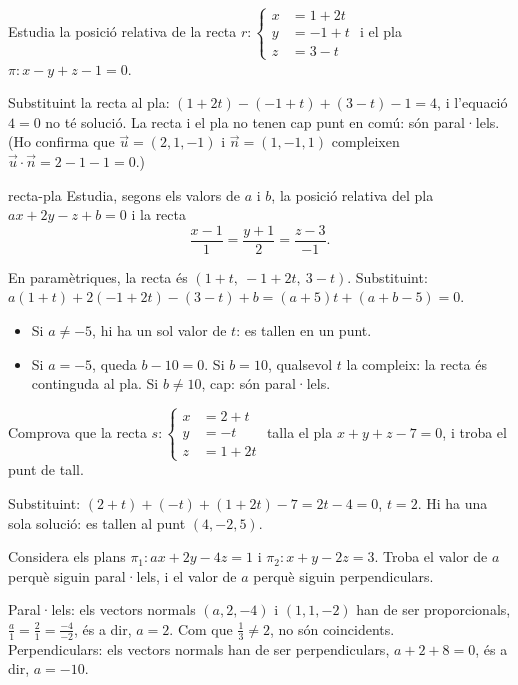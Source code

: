 \begin{apartats}

Estudia la posició relativa de la recta
$r\colon\left\{\begin{aligned}x&=1+2t\\y&=-1+t\\z&=3-t\end{aligned}\right.$ i el pla
$\pi\colon x-y+z-1=0$.

\begin{solucio}
Substituint la recta al pla: $(1+2t)-(-1+t)+(3-t)-1=4$, i l'equació $4=0$ no té solució. La recta i el
pla no tenen cap punt en comú: són paral·lels. (Ho confirma que $\vec u=(2,1,-1)$ i $\vec n=(1,-1,1)$
compleixen $\vec u\cdot\vec n=2-1-1=0$.)
\end{solucio}

\begin{tria}{recta-pla}
Estudia, segons els valors de $a$ i $b$, la posició relativa del pla $ax+2y-z+b=0$ i la recta
\[
\frac{x-1}{1}=\frac{y+1}{2}=\frac{z-3}{-1}.
\]

\begin{solucio}
En paramètriques, la recta és $(1+t,\ -1+2t,\ 3-t)$. Substituint:
$a(1+t)+2(-1+2t)-(3-t)+b=(a+5)t+(a+b-5)=0$.
\begin{itemize}
\item Si $a\ne-5$, hi ha un sol valor de $t$: es tallen en un punt.
\item Si $a=-5$, queda $b-10=0$. Si $b=10$, qualsevol $t$ la compleix: la recta és continguda al pla.
Si $b\ne10$, cap: són paral·lels.
\end{itemize}
\end{solucio}

Comprova que la recta
$s\colon\left\{\begin{aligned}x&=2+t\\y&=-t\\z&=1+2t\end{aligned}\right.$ talla el pla
$x+y+z-7=0$, i troba el punt de tall.

\begin{solucio}
Substituint: $(2+t)+(-t)+(1+2t)-7=2t-4=0$, $t=2$. Hi ha una sola solució: es tallen al punt
$(4,-2,5)$.
\end{solucio}
\end{tria}

\begin{nomesllarg}
Considera els plans $\pi_1\colon ax+2y-4z=1$ i $\pi_2\colon x+y-2z=3$. Troba el valor de $a$ perquè
siguin paral·lels, i el valor de $a$ perquè siguin perpendiculars.

\begin{solucio}
Paral·lels: els vectors normals $(a,2,-4)$ i $(1,1,-2)$ han de ser proporcionals, $\frac a1=\frac21=\frac{-4}{-2}$,
és a dir, $a=2$. Com que $\frac13\ne2$, no són coincidents.\\
Perpendiculars: els vectors normals han de ser perpendiculars, $a+2+8=0$, és a dir, $a=-10$.
\end{solucio}
\end{nomesllarg}

\end{apartats}
